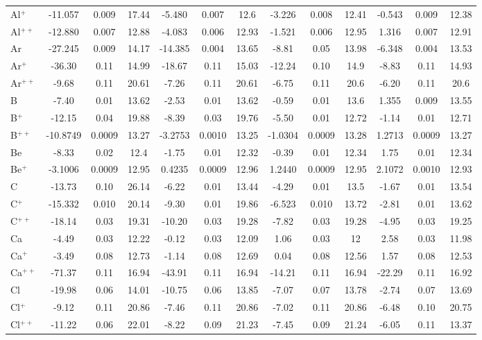 \begin{longtable}{l!{\vrule width 0.25pt}ccc!{\vrule width 0.25pt}ccc!{\vrule width 0.25pt}ccc!{\vrule width 0.25pt}ccc}
Al$^+$ & -11.057 & 0.009 & 17.44 & -5.480 & 0.007 & 12.6 & -3.226 & 0.008 & 12.41 & -0.543 & 0.009 & 12.38 \\
Al$^{++}$ & -12.880 & 0.007 & 12.88 & -4.083 & 0.006 & 12.93 & -1.521 & 0.006 & 12.95 & 1.316 & 0.007 & 12.91 \\
Ar & -27.245 & 0.009 & 14.17 & -14.385 & 0.004 & 13.65 & -8.81 & 0.05 & 13.98 & -6.348 & 0.004 & 13.53 \\
Ar$^+$ & -36.30 & 0.11 & 14.99 & -18.67 & 0.11 & 15.03 & -12.24 & 0.10 & 14.9 & -8.83 & 0.11 & 14.93 \\
Ar$^{++}$ & -9.68 & 0.11 & 20.61 & -7.26 & 0.11 & 20.61 & -6.75 & 0.11 & 20.6 & -6.20 & 0.11 & 20.6 \\
B & -7.40 & 0.01 & 13.62 & -2.53 & 0.01 & 13.62 & -0.59 & 0.01 & 13.6 & 1.355 & 0.009 & 13.55 \\
B$^+$ & -12.15 & 0.04 & 19.88 & -8.39 & 0.03 & 19.76 & -5.50 & 0.01 & 12.72 & -1.14 & 0.01 & 12.71 \\
B$^{++}$ & -10.8749 & 0.0009 & 13.27 & -3.2753 & 0.0010 & 13.25 & -1.0304 & 0.0009 & 13.28 & 1.2713 & 0.0009 & 13.27 \\
Be & -8.33 & 0.02 & 12.4 & -1.75 & 0.01 & 12.32 & -0.39 & 0.01 & 12.34 & 1.75 & 0.01 & 12.34 \\
Be$^+$ & -3.1006 & 0.0009 & 12.95 & 0.4235 & 0.0009 & 12.96 & 1.2440 & 0.0009 & 12.95 & 2.1072 & 0.0010 & 12.93 \\
C & -13.73 & 0.10 & 26.14 & -6.22 & 0.01 & 13.44 & -4.29 & 0.01 & 13.5 & -1.67 & 0.01 & 13.54 \\
C$^+$ & -15.332 & 0.010 & 20.14 & -9.30 & 0.01 & 19.86 & -6.523 & 0.010 & 13.72 & -2.81 & 0.01 & 13.62 \\
C$^{++}$ & -18.14 & 0.03 & 19.31 & -10.20 & 0.03 & 19.28 & -7.82 & 0.03 & 19.28 & -4.95 & 0.03 & 19.25 \\
Ca & -4.49 & 0.03 & 12.22 & -0.12 & 0.03 & 12.09 & 1.06 & 0.03 & 12 & 2.58 & 0.03 & 11.98 \\
Ca$^+$ & -3.49 & 0.08 & 12.73 & -1.14 & 0.08 & 12.69 & 0.04 & 0.08 & 12.56 & 1.57 & 0.08 & 12.53 \\
Ca$^{++}$ & -71.37 & 0.11 & 16.94 & -43.91 & 0.11 & 16.94 & -14.21 & 0.11 & 16.94 & -22.29 & 0.11 & 16.92 \\
Cl & -19.98 & 0.06 & 14.01 & -10.75 & 0.06 & 13.85 & -7.07 & 0.07 & 13.78 & -2.74 & 0.07 & 13.69 \\
Cl$^+$ & -9.12 & 0.11 & 20.86 & -7.46 & 0.11 & 20.86 & -7.02 & 0.11 & 20.86 & -6.48 & 0.10 & 20.75 \\
Cl$^{++}$ & -11.22 & 0.06 & 22.01 & -8.22 & 0.09 & 21.23 & -7.45 & 0.09 & 21.24 & -6.05 & 0.11 & 13.37 \\

\end{longtable}
